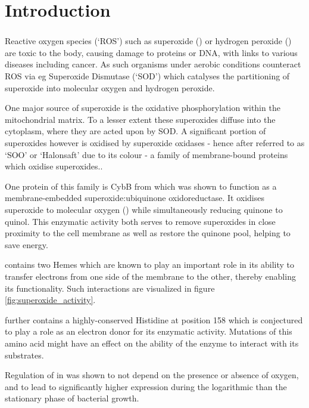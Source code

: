 \twocolumn

\part{Introduction}

\section{\hs{}}

Reactive oxygen species (`ROS') such as superoxide () or hydrogen
peroxide () are toxic to the body, causing damage to proteins or DNA,
with links to various diseases including cancer. As such organisms under
aerobic conditions counteract ROS via eg Superoxide Dismutase (`SOD') which
catalyses the partitioning of superoxide into molecular oxygen and hydrogen
peroxide.

One major source of superoxide is the oxidative phosphorylation within the
mitochondrial matrix. \cite{Novo2008} To a lesser extent these superoxides
diffuse into the cytoplasm, where they are acted upon by SOD. A significant
portion of superoxides however is oxidised by superoxide oxidases - hence after
referred to as `SOO' or `Halonsaft' due to its colour - a family of
membrane-bound proteins which oxidise superoxides.\cite{superoxide_salvaging}.

One protein of this family is CybB from \ecoli{} which was shown to function as
a membrane\hyp{}embedded superoxide:ubiquinone oxidoreductase. It oxidises
superoxide to molecular oxygen () while simultaneously reducing quinone
to quinol.\cite{superoxide_salvaging} This enzymatic activity both serves to
remove superoxides in close proximity to the cell membrane as well as restore
the quinone pool, helping to save energy.

\hs{} contains two Hemes which are known to play an important role in its
ability to transfer electrons from one side of the membrane to the other,
thereby enabling its functionality.\cite{superoxide_salvaging} Such
interactions are visualized in figure
\ref{fig:superoxide_activity}.

\hs{} further contains a highly-conserved Histidine at position 158 which is
conjectured to play a role as an electron donor for its enzymatic activity.
Mutations of this amino acid might have an effect on the ability of the enzyme
to interact with its substrates.\cite{superoxide_salvaging}

Regulation of \hs{} in \ecoli{} was shown to not depend on the presence or
absence of oxygen, and to lead to significantly higher expression during the
logarithmic than the stationary phase of bacterial
growth.\cite{superoxide_salvaging}


